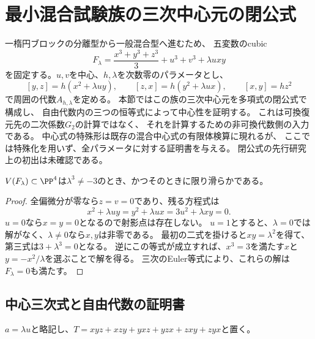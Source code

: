 \section{最小混合試験族の三次中心元の閉公式}
\label{mt:sec:family}

一楕円ブロックの分離型から一般混合型へ進むため、
五変数のcubic
\begin{equation}\label{mt:eq:classical}
 F_\lambda=\frac{x^3+y^3+z^3}{3}+u^3+v^3+\lambda uxy
\end{equation}
を固定する。$u,v$を中心、$h,\lambda$を次数零のパラメータとし、
\begin{equation}\label{mt:eq:relations}
 [y,z]=h(x^2+\lambda uy),\qquad
 [z,x]=h(y^2+\lambda ux),\qquad
 [x,y]=hz^2
\end{equation}
で周囲の代数$A_{h,\lambda}$を定める。
本節ではこの族の三次中心元を多項式の閉公式で構成し、
自由代数内の三つの恒等式によって中心性を証明する。
これは可換復元先の二次係数$G_2$の計算ではなく、
それを計算するための非可換代数側の入力である。
中心式の特殊形は既存の混合中心式の有限体検算に現れるが、
ここでは特殊化を用いず、全パラメータに対する証明書を与える。
閉公式の先行研究上の初出は未確認である。

\begin{lemma}[古典特殊ファイバーの滑らかさ]
\label{mt:lem:classical-smooth}
$V(F_\lambda)\subset\PP^4$は$\lambda^3\ne-3$のとき、かつそのときに限り滑らかである。
\end{lemma}
\begin{proof}
全偏微分が零なら$z=v=0$であり、残る方程式は
\[
 x^2+\lambda uy=y^2+\lambda ux=3u^2+\lambda xy=0.
\]
$u=0$なら$x=y=0$となるので射影点は存在しない。
$u=1$とすると、$\lambda=0$では解がなく、$\lambda\ne0$なら$x,y$は非零である。
最初の二式を掛けると$xy=\lambda^2$を得て、第三式は$3+\lambda^3=0$となる。
逆にこの等式が成立すれば、$x^3=3$を満たす$x$と
$y=-x^2/\lambda$を選ぶことで解を得る。
三次のEuler等式により、これらの解は$F_\lambda=0$も満たす。
\end{proof}

\subsection{中心三次式と自由代数の証明書}

$a=\lambda u$と略記し、$T=xyz+xzy+yxz+yzx+zxy+zyx$と置く。

